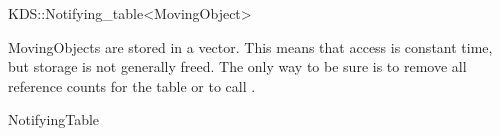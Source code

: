 

\begin{ccRefClass}{KDS::Notifying_table<MovingObject>}  %


\ccDefinition
  

MovingObjects are stored in a vector. This means that access is constant
time, but storage is not generally freed. The only way to be sure is
to remove all reference counts for the table or to call .



\ccIsModel

NotifyingTable




\end{ccRefClass}


